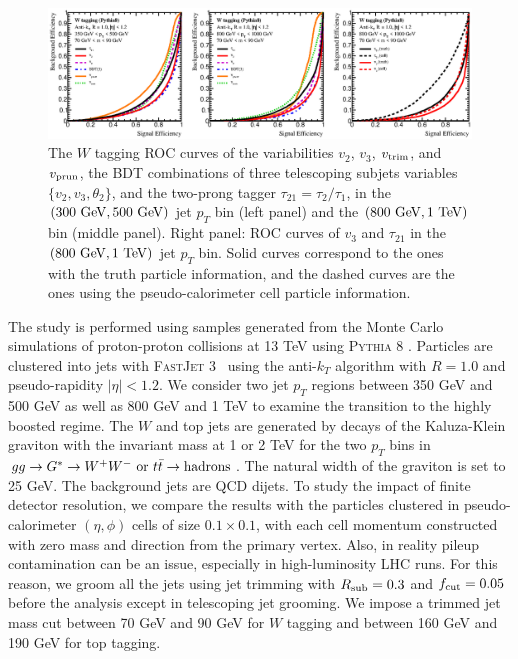 \documentclass[aps,prl,floatfix,preprintnumbers,twocolumn,groupedaddress,nofootinbib]{revtex4-1}
\begin{document}
\begin{figure}
    \includegraphics[width=2\columnwidth]{plots/W_ROCs_5.eps}
    \caption{The $W$ tagging ROC curves of the variabilities $v_2$, $v_3$, $v_{\rm trim}$, and $v_{\rm prun}$,
    the BDT combinations of three telescoping subjets variables $\{v_2, v_3, \theta_2\}$, and the two-prong tagger $\tau_{21}=\tau_{2}/\tau_{1}$, in the $(300~{\rm GeV}, 500~{\rm GeV})$ jet $p_T$ bin (left panel) and the $(800~{\rm GeV}, 1~{\rm TeV})$ bin (middle panel). Right panel: ROC curves of $v_3$ and $\tau_{21}$ in the $(800~{\rm GeV}, 1~{\rm TeV})$ jet $p_T$ bin. Solid curves correspond to the ones with the truth particle information, and the dashed curves are the ones using the pseudo-calorimeter cell particle information.}
\label{ROC_W}
\end{figure}

The study is performed using samples generated from the Monte Carlo simulations of proton-proton collisions at 13 TeV using \textsc{Pythia} 8 \cite{Sjostrand:2007gs}. Particles are clustered into jets with \textsc{FastJet} 3~\cite{Cacciari:2011ma} using the anti-$k_T$ algorithm \cite{Cacciari:2008gp} with $R=1.0$ and pseudo-rapidity $|\eta|<1.2$. We consider two jet $p_T$ regions between 350 GeV and 500 GeV as well as 800 GeV and 1 TeV to examine the transition to the highly boosted regime. The $W$ and top jets are generated by decays of the Kaluza-Klein graviton with the invariant mass at 1 or 2 TeV for the two $p_T$ bins in $gg\rightarrow G^*\rightarrow W^+W^-~{\rm or}~t\bar t\rightarrow {\rm hadrons}$. The natural width of the graviton is set to 25 GeV. The background jets are QCD dijets. To study the impact of finite detector resolution, we compare the results with the particles clustered in pseudo-calorimeter $(\eta,\phi)$ cells of size $0.1\times 0.1$, with each cell momentum constructed with zero mass and direction from the primary vertex. Also, in reality pileup contamination can be an issue, especially in high-luminosity LHC runs. For this reason, we groom all the jets using jet trimming with $R_{\rm sub}=0.3$ and $f_{\rm cut}=0.05$ before the analysis except in telescoping jet grooming. We impose a trimmed jet mass cut between 70 GeV and 90 GeV for $W$ tagging and between 160 GeV and 190 GeV for top tagging.
\end{document}
